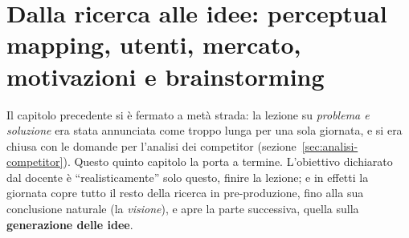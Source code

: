 
\chapter[Dalla ricerca alle idee]{Dalla ricerca alle idee: perceptual
mapping, utenti, mercato, motivazioni e brainstorming}
\label{cap:ricerca-idee}

Il capitolo precedente si è fermato a metà strada: la lezione su
\emph{problema e soluzione} era stata annunciata come troppo lunga per una
sola giornata, e si era chiusa con le domande per l'analisi dei competitor
(sezione~\ref{sec:analisi-competitor}). Questo quinto capitolo la porta a
termine. L'obiettivo dichiarato dal docente è ``realisticamente'' solo
questo, finire la lezione; e in effetti la giornata copre tutto il resto
della ricerca in pre-produzione, fino alla sua conclusione naturale (la
\emph{visione}), e apre la parte successiva, quella sulla
\textbf{generazione delle idee}.

